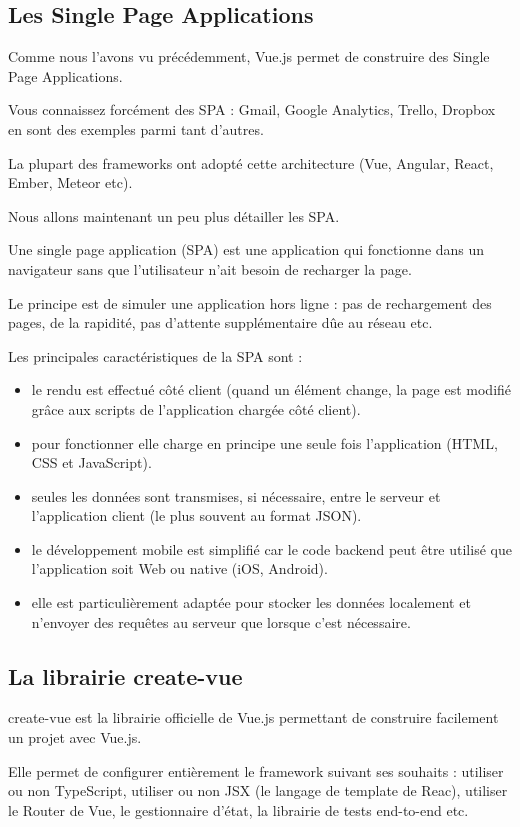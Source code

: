 \documentclass{article}
\begin{document}
\subsection{Les Single Page Applications}
Comme nous l'avons vu précédemment, Vue.js permet de construire des Single Page Applications.

Vous connaissez forcément des SPA : Gmail, Google Analytics, Trello, Dropbox en sont des exemples parmi tant d'autres.

La plupart des frameworks ont adopté cette architecture (Vue, Angular, React, Ember, Meteor etc).

Nous allons maintenant un peu plus détailler les SPA.

Une single page application (SPA) est une application qui fonctionne dans un navigateur sans que l'utilisateur n'ait besoin de recharger la page.

Le principe est de simuler une application hors ligne : pas de rechargement des pages, de la rapidité, pas d'attente supplémentaire dûe au réseau etc.

Les principales caractéristiques de la SPA sont :
\begin{itemize}
\item le rendu est effectué côté client (quand un élément change, la page est modifié grâce aux scripts de l'application chargée côté client).
\item pour fonctionner elle charge en principe une seule fois l'application (HTML, CSS et JavaScript).
\item seules les données sont transmises, si nécessaire, entre le serveur et l'application client (le plus souvent au format JSON).
\item le développement mobile est simplifié car le code backend peut être utilisé que l'application soit Web ou native (iOS, Android).
\item elle est particulièrement adaptée pour stocker les données localement et n'envoyer des requêtes au serveur que lorsque c'est nécessaire.
\end{itemize}

\subsection{La librairie create-vue}
create-vue est la librairie officielle de Vue.js permettant de construire facilement un projet avec Vue.js.

Elle permet de configurer entièrement le framework suivant ses souhaits : utiliser ou non TypeScript, utiliser ou non JSX (le langage de template de Reac), utiliser le Router de Vue, le gestionnaire d'état, la librairie de tests end-to-end etc.
\end{document}
